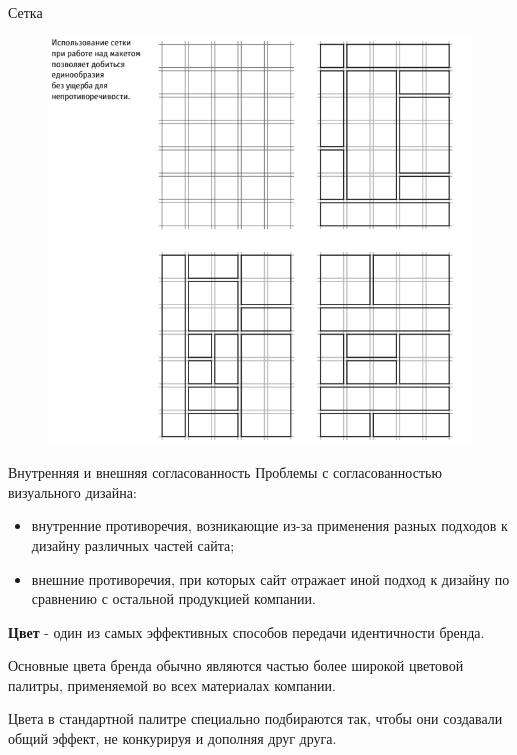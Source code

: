 \documentclass{beamer}
\begin{document}
\begin{frame}[t]{Сетка}
	\begin{figure}[h]
		\centering
		\includegraphics[scale=0.4]{images/lec05-pic03.png}
	\end{figure}
\end{frame}  

\begin{frame}[t]{Внутренняя и внешняя согласованность}
	Проблемы с согласованностью визуального дизайна:
	\begin{itemize}
		\item внутренние противоречия, возникающие из-за применения разных подходов к дизайну различных частей сайта;
		\item внешние противоречия, при которых сайт отражает иной подход к дизайну по сравнению с остальной продукцией компании.
	\end{itemize}
	\textbf{Цвет} - один из самых эффективных способов передачи идентичности бренда.
	
	Основные цвета бренда обычно являются частью более широкой цветовой палитры, применяемой во всех материалах компании. 

	Цвета в стандартной палитре специально подбираются так, чтобы они создавали общий эффект, не конкурируя и дополняя друг друга.
\end{frame}
\end{document}
